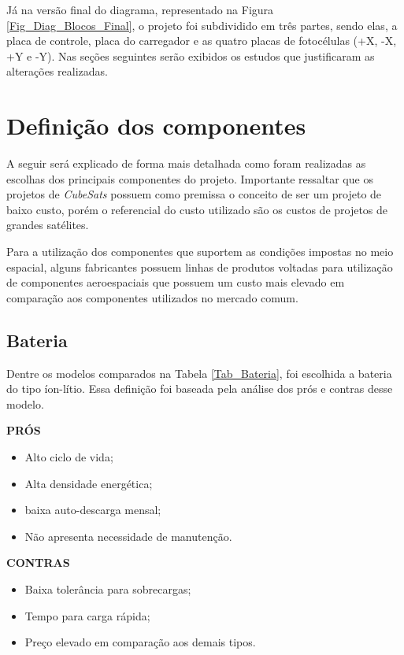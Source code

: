 \documentclass[
	12pt,				%
	openright,			%
	oneside,			%
	a4paper,			%
	english,			%
	french,				%
	spanish,			%
	brazil,				%
	oldfontcommands
	]{abntex2}
\begin{document}
	Já na versão final do diagrama, representado na Figura \ref{Fig_Diag_Blocos_Final}, o projeto foi subdividido em três partes, sendo elas, a placa de controle, placa do carregador e as quatro placas de fotocélulas (+X, -X, +Y e -Y). Nas seções seguintes serão exibidos os estudos que justificaram as alterações realizadas.
 
\section[Definição dos componentes]{Definição dos componentes}

	A seguir será explicado de forma mais detalhada como foram realizadas as escolhas dos principais componentes do projeto. Importante ressaltar que os projetos de \textit{CubeSats} possuem como premissa o conceito de ser um projeto de baixo custo, porém o referencial do custo utilizado são os custos de projetos de grandes satélites.
	
	Para a utilização dos componentes que suportem as condições impostas  no meio espacial, alguns fabricantes possuem linhas de produtos voltadas para utilização de componentes aeroespaciais que possuem um custo mais elevado em comparação aos componentes utilizados no mercado comum.

\subsection[Bateria]{Bateria} \label{Sec_Bateria}

	Dentre os modelos comparados na Tabela \ref{Tab_Bateria}, foi escolhida a bateria do tipo íon-lítio. Essa definição foi baseada pela análise dos prós e contras desse modelo.
	
	\begin{minipage}{6cm}
		\begin{center}
			\textbf{PRÓS}
		\end{center}
		
		\begin{itemize}
			\item Alto ciclo de vida;
			\item Alta densidade energética;
			\item baixa auto-descarga mensal;
			\item Não apresenta necessidade de manutenção.
		\end{itemize}
	
	\end{minipage}
	\begin{minipage}{7cm}
		\begin{center}
			\textbf{CONTRAS}
		\end{center}
		
		\begin{itemize}
			\item Baixa tolerância para sobrecargas;
			\item Tempo para carga rápida;
			\item Preço elevado em comparação aos demais tipos.
		\end{itemize}
		
	\end{minipage}
		
\end{document}

